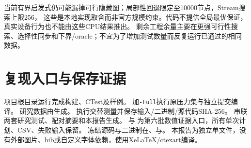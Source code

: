 \documentclass[UTF8,a4paper,11pt,fontset=fandol]{ctexart}
\begin{document}
当前有界启发式仍可能漏掉可行隐藏图；局部性回退限定至10000节点，Stream搜索上限256，
这些是本地实现取舍而非官方规模约束。代码不提供全局最优保证，真实设备行为也不能由这些CPU结果推出。
剩余工程余量主要在更强可行性搜索、选择性同步和下界/oracle；不宜为了增加测试数量而反复运行已通过的相同数据。

\section{复现入口与保存证据}
项目根目录运行完成构建、CTest及样例。
加\texttt{-Full}执行原压力集与独立提交编译。
研究数据由生成。
执行交替测量并保存输入/二进制/源代码SHA-256。
串联两套研究测试、配对摘要和本报告生成。
与
为第六批数值证据入口，所有单次计划、CSV、失败输入保留。
冻结源码与二进制在、与。
本报告为独立单文件，没有外部图片、bib或自定义字体依赖，使用XeLaTeX/ctexart编译。
\end{document}
